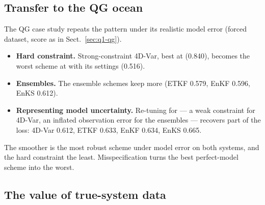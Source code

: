 
\subsection{Transfer to the QG ocean}
The QG case study repeats the pattern under its realistic model error (forced
dataset, score as in Sect.~\ref{sec:q1-qg}).
\begin{itemize}[leftmargin=*]
  \item \textbf{Hard constraint.} Strong-constraint 4D-Var, best at \Sz{}
    (0.840), becomes the worst scheme at \So{} with its \Sz{} settings (0.516).
  \item \textbf{Ensembles.} The ensemble schemes keep more (ETKF 0.579, EnKF
    0.596, EnKS 0.612).
  \item \textbf{Representing model uncertainty.} Re-tuning for \So{} --- a weak
    constraint for 4D-Var, an inflated observation error for the ensembles ---
    recovers part of the loss: 4D-Var 0.612, ETKF 0.633, EnKF 0.634, EnKS 0.665.
\end{itemize}
The smoother is the most robust scheme under model error on both systems, and
the hard constraint the least. Misspecification turns the best perfect-model
scheme into the worst.

\subsection{The value of true-system data}\label{sec:q2-oracle}

